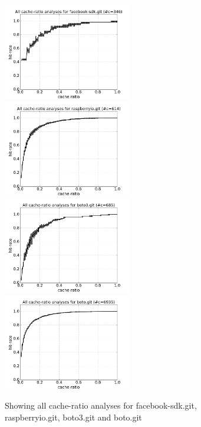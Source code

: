 \documentclass[12pt,twoside,notitlepage]{report}
\begin{document}
\begin{figure}[t]
\includegraphics[width=0.5\textwidth]{plot_all-facebook-sdk.png}
\includegraphics[width=0.5\textwidth]{plot_all-raspberryio.png}
\includegraphics[width=0.5\textwidth]{plot_all-boto3.png}
\includegraphics[width=0.5\textwidth]{plot_all-boto.png}
\caption{Showing all cache-ratio analyses for facebook-sdk.git, raspberryio.git, boto3.git and boto.git}
\label{plot_all}
\end{figure}
\end{document}

